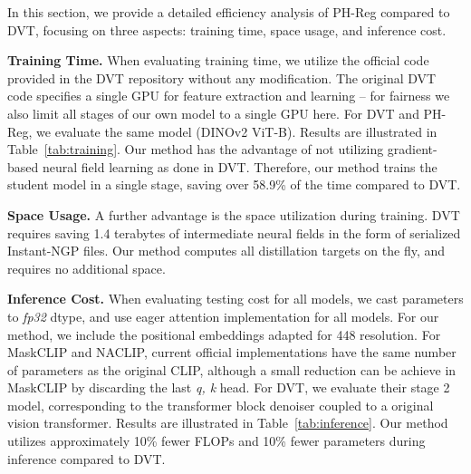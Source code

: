 In this section, we provide a detailed efficiency analysis of PH-Reg compared to DVT, focusing on three aspects: training time, space usage, and inference cost.


\textbf{Training Time.} When evaluating training time, we utilize the official code provided in the DVT repository without any modification. The original DVT code specifies a single GPU for feature extraction and learning – for fairness we also limit all stages of our own model to a single GPU here. For DVT and PH-Reg, we evaluate the same model (DINOv2 ViT-B).
Results are illustrated in Table~\ref{tab:training}. Our method has the advantage of not utilizing gradient-based neural field learning as done in DVT. Therefore, our method trains the student model in a single stage, saving over 58.9\% of the time compared to DVT.


\textbf{Space Usage.} A further advantage is the space utilization during training. DVT requires saving 1.4 terabytes of intermediate neural fields in the form of serialized Instant-NGP files. Our method computes all distillation targets on the fly, and requires no additional space.


\textbf{Inference Cost.} When evaluating testing cost for all models, we cast parameters to \emph{fp32} dtype, and use eager attention implementation for all models. For our method, we include the positional embeddings adapted for 448 resolution. For MaskCLIP and NACLIP, current official implementations have the same number of parameters as the original CLIP, although a small reduction can be achieve in MaskCLIP by discarding the last \emph{q, k} head.
For DVT, we evaluate their stage 2 model, corresponding to the transformer block denoiser coupled to a original vision transformer.
Results are illustrated in Table~\ref{tab:inference}. Our method utilizes approximately 10\% fewer FLOPs and 10\% fewer parameters during inference compared to DVT. 



